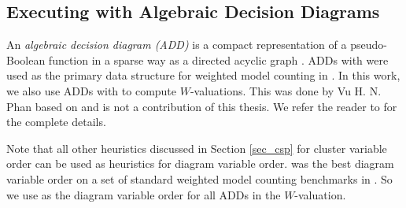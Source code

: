 \subsection{Executing with Algebraic Decision Diagrams}
An \emph{algebraic decision diagram (ADD)} is a compact representation of a pseudo-Boolean function in a sparse way as a directed acyclic graph \cite{bahar1997algebraic}.
ADDs with \cudd{} were used as the primary data structure for weighted model counting in  \cite{DPV20,phan2019weighted}.
In this work, we also use ADDs with \cudd{} to compute $W$-valuations.
This was done by Vu H. N. Phan based on  and is not a contribution of this thesis. We refer the reader to \cite{dudek2020dpmc} for the complete details.

Note that all other heuristics discussed in Section \ref{sec_csp} for cluster variable order can be used as heuristics for diagram variable order.
\Mcs{} was the best diagram variable order on a set of standard weighted model counting benchmarks in \cite{DPV20}.
So we use \Mcs{} as the diagram variable order for all ADDs in the $W$-valuation.

